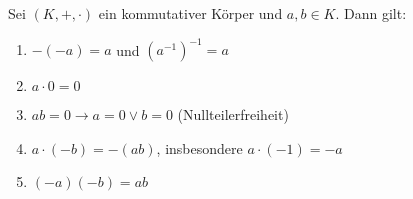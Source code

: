 Sei $(K, +, \cdot)$ ein kommutativer Körper und $a, b \in K$. Dann gilt:

\begin{enumerate}
    \item $-(-a) = a$ und $(a^{-1})^{-1} = a$
    \item $a \cdot 0 = 0$
    \item $ab = 0 \rightarrow a = 0 \lor b = 0$ (Nullteilerfreiheit)
    \item $a \cdot (-b) = -(ab)$, insbesondere $a \cdot (-1) = -a$
    \item $(-a)(-b) = ab$
\end{enumerate}